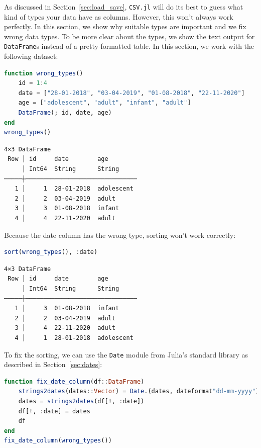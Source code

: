 \documentclass[
  notoc %
]{tufte-book}
\newcommand{\passthrough}[1]{#1}
\begin{document}
As discussed in Section~\ref{sec:load_save},
\passthrough{\lstinline!CSV.jl!} will do its best to guess what kind of
types your data have as columns. However, this won't always work
perfectly. In this section, we show why suitable types are important and
we fix wrong data types. To be more clear about the types, we show the
text output for \passthrough{\lstinline!DataFrame!}s instead of a
pretty-formatted table. In this section, we work with the following
dataset:

\begin{lstlisting}[language=Julia]
function wrong_types()
    id = 1:4
    date = ["28-01-2018", "03-04-2019", "01-08-2018", "22-11-2020"]
    age = ["adolescent", "adult", "infant", "adult"]
    DataFrame(; id, date, age)
end
wrong_types()
\end{lstlisting}

\begin{lstlisting}[language=Output]
4×3 DataFrame
 Row │ id     date        age
     │ Int64  String      String
─────┼───────────────────────────────
   1 │     1  28-01-2018  adolescent
   2 │     2  03-04-2019  adult
   3 │     3  01-08-2018  infant
   4 │     4  22-11-2020  adult
\end{lstlisting}

Because the date column has the wrong type, sorting won't work
correctly:

\begin{lstlisting}[language=Julia]
sort(wrong_types(), :date)
\end{lstlisting}

\begin{lstlisting}[language=Output]
4×3 DataFrame
 Row │ id     date        age
     │ Int64  String      String
─────┼───────────────────────────────
   1 │     3  01-08-2018  infant
   2 │     2  03-04-2019  adult
   3 │     4  22-11-2020  adult
   4 │     1  28-01-2018  adolescent
\end{lstlisting}

To fix the sorting, we can use the \passthrough{\lstinline!Date!} module
from Julia's standard library as described in Section~\ref{sec:dates}:

\begin{lstlisting}[language=Julia]
function fix_date_column(df::DataFrame)
    strings2dates(dates::Vector) = Date.(dates, dateformat"dd-mm-yyyy")
    dates = strings2dates(df[!, :date])
    df[!, :date] = dates
    df
end
fix_date_column(wrong_types())
\end{lstlisting}
\end{document}
